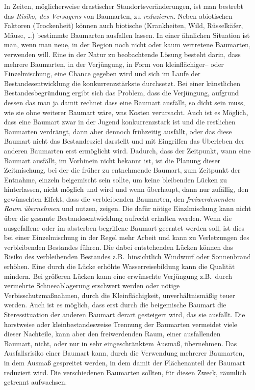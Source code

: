 \documentclass[twocolumn]{scrartcl}
\begin{document}
In Zeiten, möglicherweise drastischer Standortsveränderungen, ist man
bestrebt das \emph{Risiko, des Versagens} von Baumarten, zu
\emph{reduzieren}. Neben abiotischen Faktoren (Trockenheit) können
auch biotische (Krankheiten, Wild, Rüsselkäfer, Mäuse, \dots)
bestimmte Baumarten ausfallen lassen. In einer ähnlichen Situation ist
man, wenn man neue, in der Region noch nicht oder kaum vertretene
Baumarten, verwenden will. Eine in der Natur zu beobachtende Lösung
besteht darin, dass mehrere Baumarten, in der Verjüngung, in Form von
kleinflächiger-- oder Einzelmischung, eine Chance gegeben wird und
sich im Laufe der Bestandesentwicklung die konkurrenzstärkste
durchsetzt. Bei einer künstlichen Bestandesbegründung ergibt sich das
Problem, dass die Verjüngung, aufgrund dessen das man ja damit rechnet
dass eine Baumart ausfällt, so dicht sein muss, wie sie ohne weiterer
Baumart wäre, was Kosten verursacht. Auch ist es Möglich, dass eine
Baumart zwar in der Jugend konkurrenzstark ist und die restlichen
Baumarten verdrängt, dann aber dennoch frühzeitig ausfällt, oder das
diese Baumart nicht das Bestandesziel darstellt und mit Eingriffen das
Überleben der anderen Baumarten erst ermöglicht wird. Dadurch, dass
der Zeitpunkt, wann eine Baumart ausfällt, im Vorhinein nicht bekannt
ist, ist die Planung dieser Zeitmischung, bei der die früher zu
entnehmende Baumart, zum Zeitpunkt der Entnahme, einzeln beigemischt
sein sollte, um keine bleibenden Lücken zu hinterlassen, nicht möglich
und wird und wenn überhaupt, dann nur zufällig, den gewünschten
Effekt, dass die verbleibenden Baumarten, den \emph{freiwerdenenden
  Raum übernehmen} und nutzen, zeigen. Die dafür nötige Einzlmischung
kann nicht über die gesamte Bestandesentwicklung aufrecht erhalten
werden. Wenn die ausgefallene oder im absterben begriffene Baumart
geerntet werden soll, ist dies bei einer Einzelmischung in der Regel
mehr Arbeit und kann zu Verletzungen des verbleibenden Bestandes
führen. Die dabei entstehenden Lücken können das Risiko des
verbleibenden Bestandes z.B.\ hinsichtlich Windwurf oder Sonnenbrand
erhöhen. Eine durch die Lücke erhöhte Wasserreisebildung kann die
Qualität mindern. Bei größeren Lücken kann eine erwünschte Verjüngung
z.B.\ durch vermehrte Schneeablagerung erschwert werden oder nötige
Verbisschutzmaßnahmen, durch die Kleinflächigkeit, unverhältnismäßig
teuer werden. Auch ist es möglich, dass erst durch die beigemische
Baumart die Steressituation der anderen Baumart derart gesteigert
wird, das sie ausfällt. Die horstweise oder kleinbestandesweise
Trennung der Baumarten vermeidet viele dieser Nachteile, kann aber den
freiwerdenden Raum, einer ausfallenden Baumart, nicht, oder nur in
sehr eingeschränktem Ausmaß, übernehmen. Das Ausfallsrisiko einer
Baumart kann, durch die Verwendung mehrerer Baumarten, in dem Ausmaß
gespreitet werden, in dem damit der Flächenanteil der Baumart
reduziert wird. Die verschiedenen Baumarten sollten, für diesen Zweck,
räumlich getrennt aufwachsen.
\end{document}
